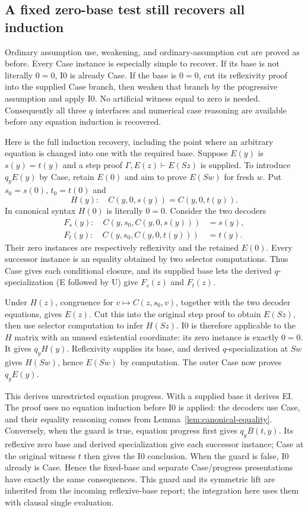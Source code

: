 \documentclass[11pt]{article}
\theoremstyle{definition}
\begin{document}
\subsection{A fixed zero-base test still recovers all induction}

Ordinary assumption use, weakening, and ordinary-assumption cut are proved
as before. Every Case instance is especially simple to recover. If its
base is not literally $0=0$, I0 is already Case. If the base is $0=0$,
cut its reflexivity proof into the supplied Case branch, then weaken that
branch by the progressive assumption and apply I0. No artificial witness
equal to zero is needed. Consequently all three $q$ interfaces and numerical
case reasoning are available before any equation induction is recovered.

Here is the full induction recovery, including the point where an arbitrary
equation is changed into one with the required base. Suppose
$E(y)$ is $s(y)=t(y)$ and a step proof
$\Gamma,E(z)\vdash E(Sz)$ is supplied. To introduce $q_yE(y)$ by Case,
retain $E(0)$ and aim to prove $E(Sw)$ for fresh $w$.
Put $s_0=s(0)$, $t_0=t(0)$ and
\[
 H(y):\quad C(y,0,s(y))=C(y,0,t(y)).
\]
In canonical syntax $H(0)$ is literally $0=0$. Consider the two decoders
\[
\begin{aligned}
 F_s(y):\quad C(y,s_0,C(y,0,s(y)))&=s(y),\\
 F_t(y):\quad C(y,s_0,C(y,0,t(y)))&=t(y).
\end{aligned}
\]
Their zero instances are respectively reflexivity and the retained $E(0)$.
Every successor instance is an equality obtained by two selector
computations. Thus Case gives each conditional closure, and its supplied
base lets the derived $q$-specialization (E followed by U) give
$F_s(z)$ and $F_t(z)$.

Under $H(z)$, congruence for $v\mapsto C(z,s_0,v)$, together with the two
decoder equations, gives $E(z)$. Cut this into the original step proof to
obtain $E(Sz)$, then use selector computation to infer $H(Sz)$. I0 is
therefore applicable to the $H$ matrix with an unused existential
coordinate: its zero instance is exactly $0=0$. It gives $q_yH(y)$.
Reflexivity supplies its base, and derived $q$-specialization at $Sw$
gives $H(Sw)$, hence $E(Sw)$
by computation. The outer Case now proves $q_yE(y)$.

This derives unrestricted equation progress. With a supplied base it derives
EI. The proof uses no equation induction before I0 is applied: the decoders
use Case, and their equality reasoning comes from
Lemma~\ref{lem:canonical-equality}. Conversely, when the guard is true, equation progress first gives
$q_yB(t,y)$. Its reflexive zero base and derived specialization give each
successor instance; Case at the original witness $t$ then gives the I0
conclusion. When the guard is false, I0 already is Case. Hence the fixed-base and separate Case/progress presentations
have exactly the same consequences. This guard and its symmetric lift are
inherited from the incoming reflexive-base report; the integration here
uses them with clausal single evaluation.
\end{document}
